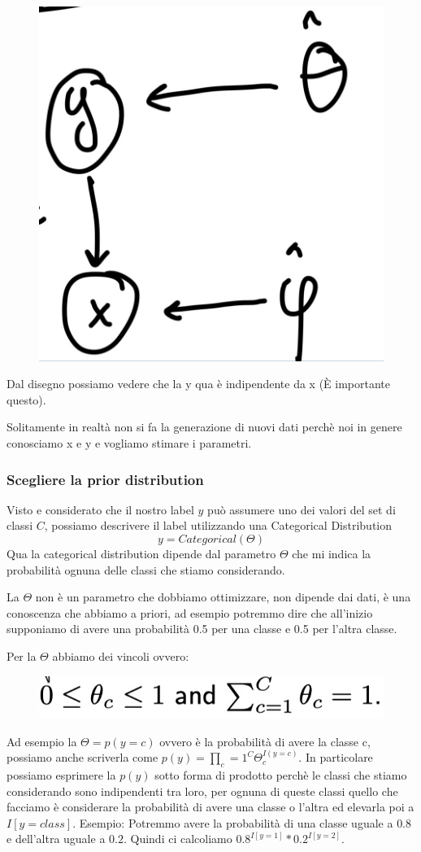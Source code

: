 \documentclass[14pt]{extreport}
\begin{document}
\begin{figure}[H]
	\centering
	\includegraphics[width=0.2\linewidth]{160.jpeg}
\end{figure}

Dal disegno possiamo vedere che la y qua è indipendente da x (È importante questo).

Solitamente in realtà non si fa la generazione di nuovi dati perchè noi in genere conosciamo x e y e vogliamo stimare i parametri.

\subsubsection{Scegliere la prior distribution}

Visto e considerato che il nostro label $y$ può assumere uno dei valori del set di classi $C$, possiamo descrivere il label utilizzando una
Categorical Distribution $$y = Categorical(\Theta)$$ Qua la categorical distribution dipende dal parametro $\Theta$ che mi indica la probabilità
ognuna delle classi che stiamo considerando.

La $\Theta$ non è un parametro che dobbiamo ottimizzare, non dipende dai dati, è una conoscenza che abbiamo a priori, ad esempio potremmo dire che
all'inizio supponiamo di avere una probabilità 0.5 per una classe e 0.5 per l'altra classe.

Per la $\Theta$ abbiamo dei vincoli ovvero:
\begin{figure}[H]
	\centering
	\includegraphics[width=0.5\linewidth]{161.jpeg}
\end{figure}

Ad esempio la $\Theta = p(y=c)$ ovvero è la probabilità di avere la classe c, possiamo anche scriverla come $p(y) = \prod_c=1^C \Theta_c^{I(y=c)}$. In
particolare possiamo esprimere la $p(y)$ sotto forma di prodotto perchè le classi che stiamo considerando sono indipendenti tra loro, per ognuna di
queste classi quello che facciamo è considerare la probabilità di avere una classe o l'altra ed elevarla poi a $I[y=class]$. Esempio: Potremmo avere
la probabilità di una classe uguale a $0.8$ e dell'altra uguale a $0.2$. Quindi ci calcoliamo $0.8^{I[y=1]}*0.2^{I[y=2]}$.
\end{document}
